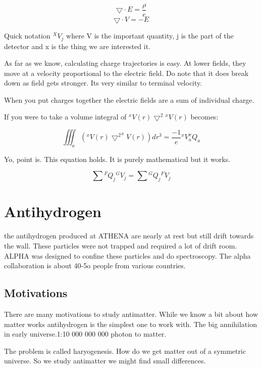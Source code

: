 \documentclass[english, 11pt]{article}
\begin{document}
\[  \bigtriangledown \cdot E = \frac{\rho}{e} \]
\[  \bigtriangledown \cdot V = -E \]

Quick notation $ ^XV_j $ where V is the important quantity, j is the part of the detector and x is the thing we are interested it.

As far as we know, calculating charge trajectories is easy. At lower fields, they move at a velocity proportional to the electric field. Do note that it does break down as field gets stronger. Its very similar to terminal velocity.

\begin{defn}[Superposition]
  When you put charges together the electric fields are a sum of individual charge.
\end{defn}

If you were to take a volume integral of $ ^xV(r)\bigtriangledown^{2} {}^{x} V(r)$ becomes:

\[ \iiint_a(^xV(r){\bigtriangledown^{2}} ^xV(r))dr^3 = {\frac{-1}{e}} {}^xV_a ^xQ_a \]

Yo, point is. This equation holds. It is purely mathematical but it works.

\[ \sum {}^F Q_j {}^G V_j = \sum {}^G Q_j {}^FV_j\]

\section{Antihydrogen} %
\label{sec:antihydrogen}

the antihydrogen produced at ATHENA are nearly at rest but still drift towards the wall. These particles were not trapped and required a lot of drift room. ALPHA was designed to confine these particles and do spectroscopy. The alpha collaboration is about 40-5o people from various countries.

\subsection{Motivations} %
\label{sub:motivations}

There are many motivations to study antimatter.  While we know a bit about how matter works antihydrogen is the simplest one to work with.
The big annihilation in early universe.1:10 000 000 000 photon to matter.

The problem is called haryogenesis. How do we get matter out of a symmetric universe. So we study antimatter we might find small differences.
\end{document}
